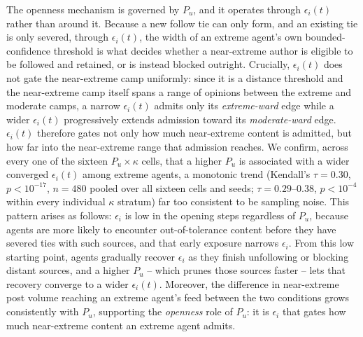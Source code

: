 \documentclass{svproc}
\def\BoundedConfidence{\epsilon} %
\def\VCR{\kappa}                 %
\begin{document}
The openness mechanism is governed by $P_u$, and it operates through
$\BoundedConfidence_i(t)$ rather than around it. Because a new
follow tie can only form, and an existing tie is only severed,
through $\BoundedConfidence_i(t)$, the width of an extreme agent's
own bounded-confidence threshold is what decides whether a
near-extreme author is eligible to be followed and retained, or is
instead blocked outright. Crucially, $\BoundedConfidence_i(t)$ does
not gate the near-extreme camp uniformly: since it is a distance
threshold and the near-extreme camp itself spans a range of
opinions between the extreme and moderate camps, a narrow
$\BoundedConfidence_i(t)$ admits only its \emph{extreme-ward} edge
while a wider $\BoundedConfidence_i(t)$ progressively extends
admission toward its \emph{moderate-ward} edge.
$\BoundedConfidence_i(t)$ therefore gates not only how much
near-extreme content is admitted, but how far into the near-extreme
range that admission reaches. We confirm, across every one of the
sixteen $P_u\times\VCR$ cells, that a higher $P_u$ is associated
with a wider converged $\BoundedConfidence_i(t)$ among extreme
agents, a monotonic trend (Kendall's $\tau=0.30$, $p<10^{-17}$,
$n=480$ pooled over all sixteen cells and seeds; $\tau=0.29$--$0.38$,
$p<10^{-4}$ within every individual $\VCR$ stratum) far too
consistent to be sampling noise. This pattern arises as follows:
$\BoundedConfidence_i$ is low in the opening steps regardless of
$P_u$, because agents are more likely to encounter out-of-tolerance
content before they have severed ties with such sources, and that
early exposure narrows $\BoundedConfidence_i$. From this low
starting point, agents gradually recover $\BoundedConfidence_i$ as
they finish unfollowing or blocking distant sources, and a higher
$P_u$ -- which prunes those sources faster -- lets that recovery
converge to a wider $\BoundedConfidence_i(t)$. Moreover, the
difference in near-extreme post volume reaching an extreme agent's
feed between the two conditions grows consistently with $P_u$,
supporting the \emph{openness} role of $P_u$: it is
$\BoundedConfidence_i$ that gates how much near-extreme content an
extreme agent admits.
\end{document}

